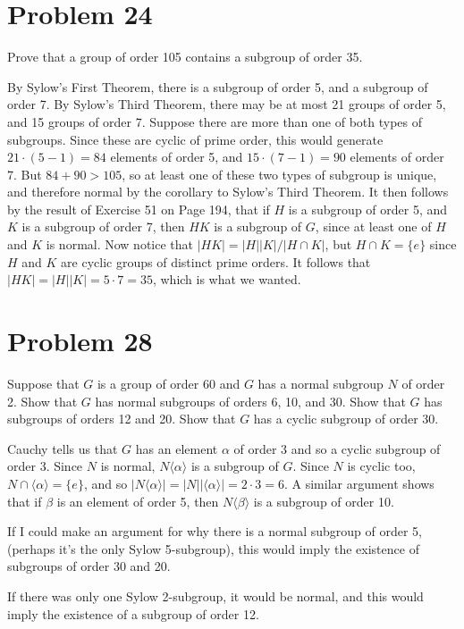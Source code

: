 \documentclass{article}
\begin{document}
\pagebreak
\section*{Problem 24}

Prove that a group of order 105 contains a subgroup of order 35.

By Sylow's First Theorem, there is a subgroup of order 5, and a subgroup
of order 7.  By Sylow's Third Theorem, there
may be at most 21 groups of order 5, and 15 groups of order 7.  Suppose there
are more than one of both types of subgroups.  Since these are cyclic
of prime order, this would generate
$21\cdot(5-1)=84$ elements of order 5,
and $15\cdot(7-1)=90$ elements of order 7.  But $84+90>105$, so at least one
of these two types of subgroup is unique, and therefore normal by the corollary to
Sylow's Third Theorem.
It then follows by the result of Exercise 51 on
Page 194, that if $H$ is a subgroup of order 5, and $K$ is a subgroup of order 7,
then $HK$ is a subgroup of $G$, since at least one of $H$ and $K$ is normal.
Now notice that $|HK|=|H||K|/|H\cap K|$, but $H\cap K=\{e\}$ since $H$ and $K$
are cyclic groups of distinct prime orders.  It follows that $|HK|=|H||K|=5\cdot 7=35$,
which is what we wanted.

\section*{Problem 28}

Suppose that $G$ is a group of order 60 and $G$ has a normal
subgroup $N$ of order 2.  Show that $G$ has normal subgroups
of orders 6, 10, and 30.  Show that $G$ has subgroups of
orders 12 and 20.  Show that $G$ has a cyclic subgroup of order 30.

Cauchy tells us that $G$ has an element $\alpha$ of order 3 and so a
cyclic subgroup of order 3.  Since $N$ is normal, $N\langle\alpha\rangle$
is a subgroup of $G$.  Since $N$ is cyclic too, $N\cap\langle\alpha\rangle=\{e\}$,
and so $|N\langle\alpha\rangle|=|N||\langle\alpha\rangle|=2\cdot 3=6$.
A similar argument shows that if $\beta$ is an element of order 5, then
$N\langle\beta\rangle$ is a subgroup of order 10.

If I could make an argument for why there is a normal subgroup of order 5,
(perhaps it's the only Sylow 5-subgroup), this would imply the existence
of subgroups of order 30 and 20.

If there was only one Sylow 2-subgroup, it would be normal, and this would
imply the existence of a subgroup of order 12.
\end{document}
